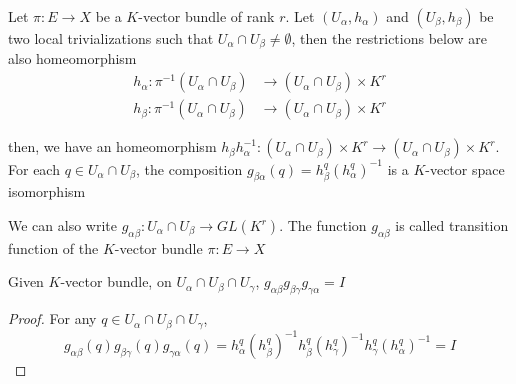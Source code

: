 \begin{definition}
	Let $\pi: E \to X$ be a $K$-vector bundle of rank $r$. Let $(U_\alpha, h_\alpha)$ and $(U_\beta, h_\beta)$ be two local trivializations such that $U_\alpha \cap U_\beta \neq \emptyset$, then the restrictions below are also homeomorphism
	\begin{align*}
		h_\alpha: \pi^{-1}(U_\alpha \cap U_\beta) &\to (U_\alpha \cap U_\beta) \times K^r \\
		h_\beta: \pi^{-1}(U_\alpha \cap U_\beta) &\to (U_\alpha \cap U_\beta) \times K^r
	\end{align*}
	
	then, we have an homeomorphism $h_\beta h^{-1}_\alpha: (U_\alpha \cap U_\beta) \times K^r \to (U_\alpha \cap U_\beta) \times K^r$. For each $q \in U_\alpha \cap U_\beta$, the composition $g_{\beta \alpha}(q) = h^q_\beta (h^q_\alpha)^{-1}$ is a $K$-vector space isomorphism
	\begin{center}
	\end{center}
	
	We can also write $g_{\alpha\beta}: U_\alpha \cap U_\beta \to GL(K^r)$. The function $g_{\alpha\beta}$ is called transition function of the $K$-vector bundle $\pi: E \to X$
\end{definition}

\begin{proposition}
	Given $K$-vector bundle, on $U_\alpha \cap U_\beta \cap U_\gamma$, $g_{\alpha\beta} g_{\beta\gamma} g_{\gamma\alpha} = I$
	\begin{proof}
		For any $q \in U_\alpha \cap U_\beta \cap U_\gamma$,
		$$
		g_{\alpha\beta}(q) g_{\beta\gamma}(q) g_{\gamma\alpha}(q) = h_\alpha^q (h_\beta^{q})^{-1} h_\beta^q (h_\gamma^q)^{-1} h_\gamma^q (h_\alpha^q)^{-1} = I
		$$
	\end{proof}
\end{proposition}

